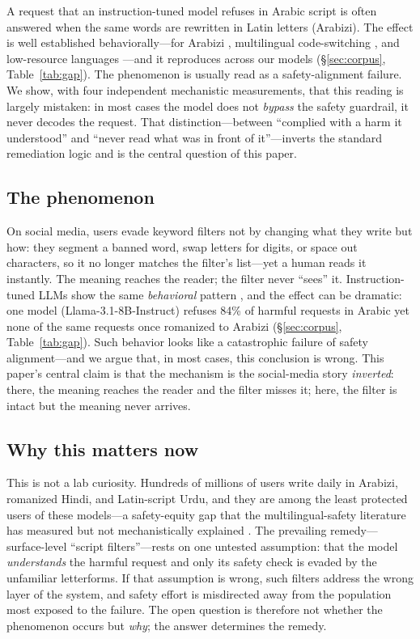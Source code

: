 \documentclass[11pt]{article}
\begin{document}
A request that an instruction-tuned model refuses in Arabic script is often answered when the same words are rewritten in Latin letters (Arabizi). The effect is well established behaviorally---for Arabizi \citep{alghanim2024}, multilingual code-switching \citep{yoo2025}, and low-resource languages \citep{yong2023}---and it reproduces across our models (\S\ref{sec:corpus}, Table~\ref{tab:gap}). The phenomenon is usually read as a safety-alignment failure. We show, with four independent mechanistic measurements, that this reading is largely mistaken: in most cases the model does not \emph{bypass} the safety guardrail, it never decodes the request. That distinction---between ``complied with a harm it understood'' and ``never read what was in front of it''---inverts the standard remediation logic and is the central question of this paper.

\subsection{The phenomenon}
On social media, users evade keyword filters not by changing what they write but how: they segment a banned word, swap letters for digits, or space out characters, so it no longer matches the filter's list---yet a human reads it instantly. The meaning reaches the reader; the filter never ``sees'' it. Instruction-tuned LLMs show the same \emph{behavioral} pattern \citep{alghanim2024,yoo2025,jamil2026}, and the effect can be dramatic: one model (Llama-3.1-8B-Instruct) refuses 84\% of harmful requests in Arabic yet none of the same requests once romanized to Arabizi (\S\ref{sec:corpus}, Table~\ref{tab:gap}). Such behavior looks like a catastrophic failure of safety alignment---and we argue that, in most cases, this conclusion is wrong. This paper's central claim is that the mechanism is the social-media story \emph{inverted}: there, the meaning reaches the reader and the filter misses it; here, the filter is intact but the meaning never arrives.

\subsection{Why this matters now}
\label{sec:why}
This is not a lab curiosity. Hundreds of millions of users write daily in Arabizi, romanized Hindi, and Latin-script Urdu, and they are among the least protected users of these models---a safety-equity gap that the multilingual-safety literature has measured but not mechanistically explained \citep{yong2023}. The prevailing remedy---surface-level ``script filters''---rests on one untested assumption: that the model \emph{understands} the harmful request and only its safety check is evaded by the unfamiliar letterforms. If that assumption is wrong, such filters address the wrong layer of the system, and safety effort is misdirected away from the population most exposed to the failure. The open question is therefore not whether the phenomenon occurs but \emph{why}; the answer determines the remedy.
\end{document}
